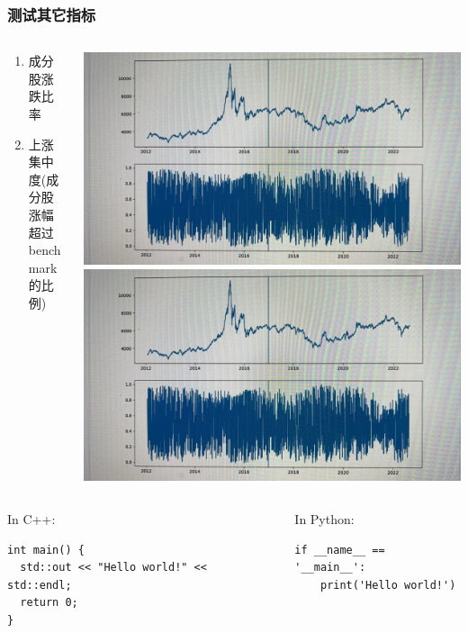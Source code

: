 \documentclass[aspectratio=169,9pt]{beamer}
\begin{document}
\begin{frame}
  \frametitle{测试其它指标}
  \begin{columns}
    \begin{column}{0.5\textwidth}
      \begin{enumerate}
      \item 成分股涨跌比率
      \item 上涨集中度(成分股涨幅超过benchmark的比例)
      \end{enumerate}
    \end{column}
    \begin{column}{0.5\textwidth}
      \includegraphics[height=0.4\paperheight]{media/rise-rates.jpg}
      \includegraphics[height=0.4\paperheight]{media/rise-rates.jpg}
    \end{column}
  \end{columns}
\end{frame}

\begin{frame}[fragile]
  \begin{columns}
    \begin{column}{0.4\textwidth}
      In C++:
      \begin{verbatim}
int main() {
  std::out << "Hello world!" << std::endl;
  return 0;
}
      \end{verbatim}
    \end{column}
    \begin{column}{0.4\textwidth}
      In Python:
      \begin{verbatim}
if __name__ == '__main__':
    print('Hello world!')
      \end{verbatim}
    \end{column}
  \end{columns}
\end{frame}
\end{document}
